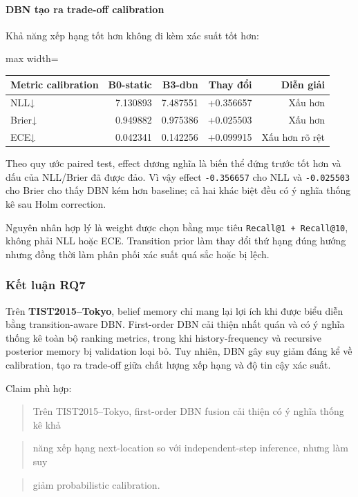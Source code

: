\paragraph{DBN tạo ra trade-off calibration}

Khả năng xếp hạng tốt hơn không đi kèm xác suất tốt hơn:

\begin{table}[!htbp]
\centering
\scriptsize
\setlength{\tabcolsep}{2.5pt}
\begin{adjustbox}{max width=\textwidth}
\begin{tabular}{@{}lrrrr@{}}
\toprule
Metric calibration & B0-static & B3-dbn & Thay đổi & Diễn giải \\
\midrule
NLL↓ & 7.130893 & 7.487551 & +0.356657 & Xấu hơn \\
Brier↓ & 0.949882 & 0.975386 & +0.025503 & Xấu hơn \\
ECE↓ & 0.042341 & 0.142256 & +0.099915 & Xấu hơn rõ rệt \\
\bottomrule
\end{tabular}
\end{adjustbox}
\end{table}

Theo quy ước paired test, effect dương nghĩa là biến thể đứng trước tốt hơn và dấu của NLL/Brier đã được đảo. Vì vậy effect \texttt{-0.356657} cho NLL và \texttt{-0.025503} cho Brier cho thấy DBN kém hơn baseline; cả hai khác biệt đều có ý nghĩa thống kê sau Holm correction.

Nguyên nhân hợp lý là weight được chọn bằng mục tiêu \texttt{Recall@1 + Recall@10}, không phải NLL hoặc ECE. Transition prior làm thay đổi thứ hạng đúng hướng nhưng đồng thời làm phân phối xác suất quá sắc hoặc bị lệch.

\subsubsection*{Kết luận RQ7}

Trên \textbf{TIST2015--Tokyo}, belief memory chỉ mang lại lợi ích khi được biểu diễn bằng transition-aware DBN. First-order DBN cải thiện nhất quán và có ý nghĩa thống kê toàn bộ ranking metrics, trong khi history-frequency và recursive posterior memory bị validation loại bỏ. Tuy nhiên, DBN gây suy giảm đáng kể về calibration, tạo ra trade-off giữa chất lượng xếp hạng và độ tin cậy xác suất.

Claim phù hợp:

\begin{quote}\small Trên TIST2015--Tokyo, first-order DBN fusion cải thiện có ý nghĩa thống kê khả\end{quote}
\begin{quote}\small năng xếp hạng next-location so với independent-step inference, nhưng làm suy\end{quote}
\begin{quote}\small giảm probabilistic calibration.\end{quote}
